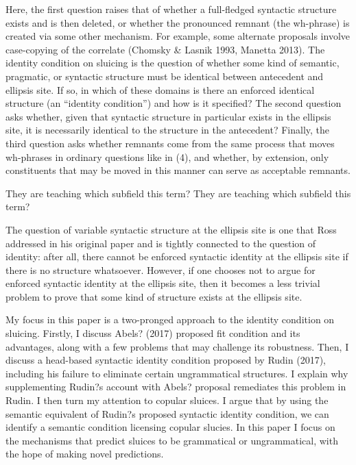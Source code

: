 \documentclass{turabian-researchpaper}
\begin{document}
\noindent Here, the first question raises that of whether a full-fledged syntactic structure exists and is then deleted, or whether the pronounced remnant (the wh-phrase) is created via some other mechanism. For example, some alternate proposals involve case-copying of the correlate (Chomsky \& Lasnik 1993, Manetta 2013). 
The identity condition on sluicing is the question of whether some kind of semantic, pragmatic, or syntactic structure must be identical between antecedent and ellipsis site. If so, in which of these domains is there an enforced identical structure (an ``identity condition'') and how is it specified?  The second question asks whether, given that syntactic structure in particular exists in the ellipsis site, it is necessarily identical to the structure in the antecedent? Finally, the third question asks whether remnants come from the same process that moves wh-phrases in ordinary questions like in (4), and whether, by extension, only constituents that may be moved in this manner can serve as acceptable remnants.  

\begin{exe}
\ex\label{whichsubfield}
\begin{xlist}
\ex They are teaching which subfield this term? 
\ex They are teaching which subfield this term? 
\end{xlist}
\end{exe}

The question of variable syntactic structure at the ellipsis site is one that Ross addressed in his original paper and is tightly connected to the question of identity: after all, there cannot be enforced syntactic identity at the ellipsis site if there is no structure whatsoever. However, if one chooses not to argue for enforced syntactic identity at the ellipsis site, then it becomes a less trivial problem to prove that some kind of structure exists at the ellipsis site. 

My focus in this paper is a two-pronged approach to the identity condition on sluicing. 
Firstly, I discuss Abels? (2017) proposed fit condition and its advantages, along with a few problems that may challenge its robustness. Then, I discuss a head-based syntactic identity condition proposed by Rudin (2017), including his failure to eliminate certain ungrammatical structures. I explain why supplementing Rudin?s account with Abels? proposal remediates this problem in Rudin. I then turn my attention to copular sluices. I argue that by using the semantic equivalent of Rudin?s proposed syntactic identity condition, we can identify a semantic condition licensing copular slucies. In this paper I focus on the mechanisms that predict sluices to be grammatical or ungrammatical, with the hope of making novel predictions.  
\end{document}
